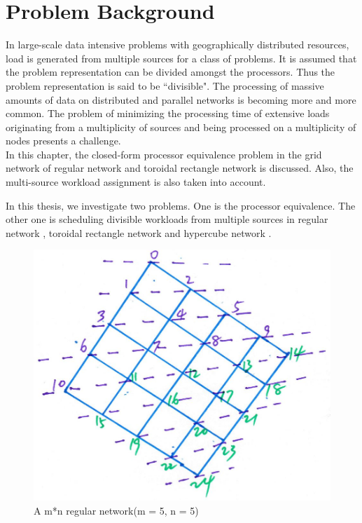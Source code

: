 \section{Problem Background}
In large-scale data intensive problems with geographically distributed resources,  load is generated from multiple sources\cite{moges2009grid} for a class of problems.  It is assumed that the problem representation can be divided amongst the processors.  Thus the problem representation is said to be ``divisible".  The processing of massive amounts of data on distributed and parallel networks is becoming more and more common.  The problem of minimizing the processing time of extensive loads originating from a multiplicity of sources and being processed on a multiplicity of nodes presents a challenge.  \\
In this chapter, the closed-form processor equivalence\cite{robertazzi1993processor}\cite{Liu_1schedulingdivisible} problem in the grid network of regular network and toroidal rectangle network is discussed.  Also, the multi-source workload assignment is also taken into account.

In this thesis, we investigate two problems. One is the processor equivalence.  The other one is scheduling divisible workloads from multiple sources in regular network , toroidal rectangle network  and hypercube network .\\

\begin{figure}[!ht]
\centering
\includegraphics[width=0.8\columnwidth]{figure/5t5.JPG}
\caption{A m*n regular network(m = 5,  n = 5)}
\label{fig:5t5}
\end{figure}

